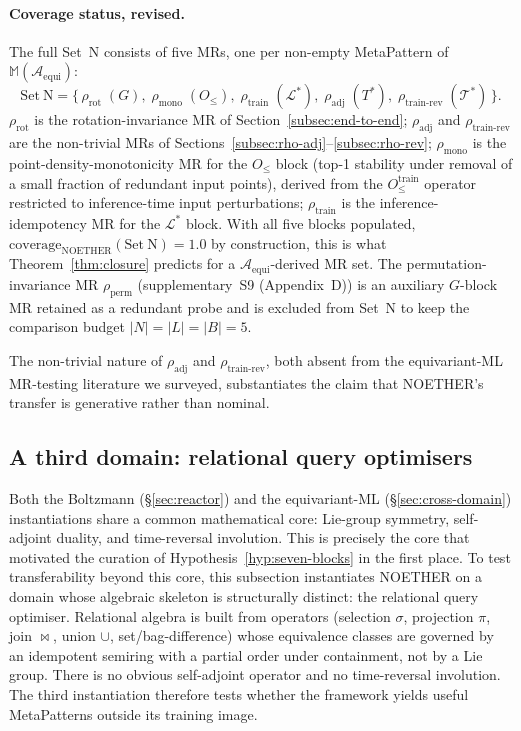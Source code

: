 \documentclass[acmsmall, screen]{acmart}
\begin{document}
\paragraph{Coverage status, revised.} The full Set~N consists of five MRs, one per non-empty MetaPattern of $\mathbb{M}(\mathcal{A}_{\mathrm{equi}})$:
$$
\mathrm{Set\ N} = \bigl\{\,\rho_{\mathrm{rot}}\;(G),\; \rho_{\mathrm{mono}}\;(O_{\le}),\; \rho_{\mathrm{train}}\;(\mathcal{L}^*),\; \rho_{\mathrm{adj}}\;(T^*),\; \rho_{\mathrm{train\text{-}rev}}\;(\mathcal{T}^*)\,\bigr\}.
$$
$\rho_{\mathrm{rot}}$ is the rotation-invariance MR of Section~\ref{subsec:end-to-end}; $\rho_{\mathrm{adj}}$ and $\rho_{\mathrm{train\text{-}rev}}$ are the non-trivial MRs of Sections~\ref{subsec:rho-adj}--\ref{subsec:rho-rev}; $\rho_{\mathrm{mono}}$ is the point-density-monotonicity MR for the $O_{\le}$ block (top-1 stability under removal of a small fraction of redundant input points), derived from the $O_{\le}^{\mathrm{train}}$ operator restricted to inference-time input perturbations; $\rho_{\mathrm{train}}$ is the inference-idempotency MR for the $\mathcal{L}^*$ block. With all five blocks populated, $\mathrm{coverage}_{\mathrm{NOETHER}}(\mathrm{Set\ N}) = 1.0$ by construction, this is what Theorem~\ref{thm:closure} predicts for a $\mathcal{A}_{\mathrm{equi}}$-derived MR set. The permutation-invariance MR $\rho_{\mathrm{perm}}$ (supplementary~S9 (Appendix~D)) is an auxiliary $G$-block MR retained as a redundant probe and is excluded from Set~N to keep the comparison budget $|N| = |L| = |B| = 5$.

The non-trivial nature of $\rho_{\mathrm{adj}}$ and $\rho_{\mathrm{train\text{-}rev}}$, both absent from the equivariant-ML MR-testing literature we surveyed, substantiates the claim that NOETHER's transfer is generative rather than nominal.

\subsection{A third domain: relational query optimisers}
\label{subsec:third-domain}

Both the Boltzmann (\S\ref{sec:reactor}) and the equivariant-ML (\S\ref{sec:cross-domain}) instantiations share a common mathematical core: Lie-group symmetry, self-adjoint duality, and time-reversal involution. This is precisely the core that motivated the curation of Hypothesis~\ref{hyp:seven-blocks} in the first place. To test transferability beyond this core, this subsection instantiates NOETHER on a domain whose algebraic skeleton is structurally distinct: the relational query optimiser. Relational algebra is built from operators (selection $\sigma$, projection $\pi$, join $\bowtie$, union $\cup$, set/bag-difference) whose equivalence classes are governed by an idempotent semiring with a partial order under containment, not by a Lie group. There is no obvious self-adjoint operator and no time-reversal involution. The third instantiation therefore tests whether the framework yields useful MetaPatterns outside its training image.
\end{document}
